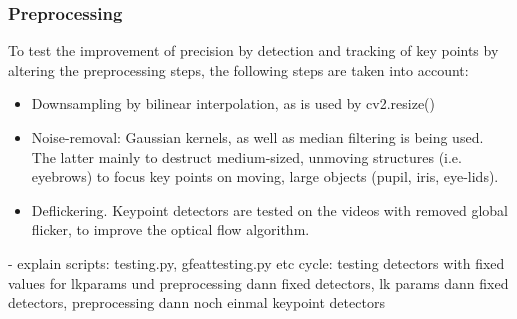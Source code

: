 \documentclass[Bachelorarbeit.tex]{subfiles}
\begin{document}
\subsubsection{Preprocessing}
To test the improvement of precision by detection and tracking of key points by altering the preprocessing steps, the following steps are taken into account:
\begin{itemize}
	\item Downsampling by bilinear interpolation, as is used by cv2.resize()
	\item Noise-removal: Gaussian kernels, as well as median filtering is being used. The latter mainly to destruct medium-sized, unmoving structures (i.e. eyebrows) to focus key points on moving, large objects (pupil, iris, eye-lids).
	\item Deflickering. Keypoint detectors are tested on the videos with removed global flicker, to improve the optical flow algorithm. 
\end{itemize}


- explain scripts: testing.py, gfeattesting.py etc
cycle: testing detectors with fixed values for lkparams und preprocessing
dann fixed detectors, lk params
dann fixed detectors, preprocessing
dann noch einmal keypoint detectors


\FloatBarrier
\end{document}
